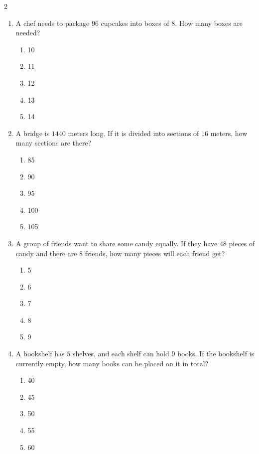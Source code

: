 \documentclass[10pt]{article}
\begin{document}
\begin{multicols}{2}
\begin{enumerate}[label=\textbf{Q\arabic*.}, leftmargin=*, itemsep=6pt, parsep=0pt]
  \item \small A chef needs to package $96$ cupcakes into boxes of $8$. How many boxes are needed?
  \begin{enumerate}[label=(\Alph*), leftmargin=0.6cm, nosep, itemsep=2pt]
    \item 10
    \item 11
    \item 12
    \item 13
    \item 14
  \end{enumerate}

  \item \small A bridge is $1440$ meters long. If it is divided into sections of $16$ meters, how many sections are there?
  \begin{enumerate}[label=(\Alph*), leftmargin=0.6cm, nosep, itemsep=2pt]
    \item 85
    \item 90
    \item 95
    \item 100
    \item 105
  \end{enumerate}

  \item \small A group of friends want to share some candy equally. If they have $48$ pieces of candy and there are $8$ friends, how many pieces will each friend get?
  \begin{enumerate}[label=(\Alph*), leftmargin=0.6cm, nosep, itemsep=2pt]
    \item 5
    \item 6
    \item 7
    \item 8
    \item 9
  \end{enumerate}

  \item \small A bookshelf has $5$ shelves, and each shelf can hold $9$ books. If the bookshelf is currently empty, how many books can be placed on it in total?
  \begin{enumerate}[label=(\Alph*), leftmargin=0.6cm, nosep, itemsep=2pt]
    \item 40
    \item 45
    \item 50
    \item 55
    \item 60
  \end{enumerate}


\end{enumerate}
\end{multicols}
\end{document}
